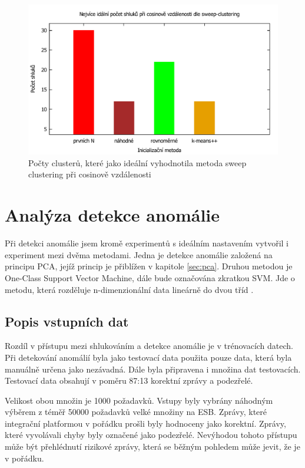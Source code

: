 \documentclass[thesis=M,czech]{FITthesis}[2012/10/20]
\newcommand{\tmpframe}[1]{\fbox{#1}}
\renewcommand{\tmpframe}[1]{#1}
\begin{document}
		\begin{figure}[htb]\centering
			\tmpframe{\includegraphics[width=\textwidth]{./img/cosine-sweep-clusters}}	
			\caption{Počty clusterů, které jako ideální vyhodnotila metoda sweep clustering při cosinově vzdálenosti}
			\label{fig:k-means-num-clusters-cosine}
		\end{figure}
	
		
	\section{Analýza detekce anomálie}
		Při detekci anomálie jsem kromě experimentů s ideálním nastavením vytvořil i experiment mezi dvěma metodami. Jedna je detekce anomálie založená na principu PCA, jejíž princip je přiblížen v kapitole \ref{sec:pca}. Druhou metodou je One-Class Support Vector Machine, dále bude označována zkratkou SVM. Jde o metodu, která rozděluje n-dimenzionální data lineárně do dvou tříd \cite{svm}.
	
		\subsection{Popis vstupních dat}
			Rozdíl v přístupu mezi shlukováním a detekce anomálie je v trénovacích datech. Při detekování anomálií byla jako testovací data použita pouze data, která byla manuálně určena jako nezávadná. Dále byla připravena i množina dat testovacích. Testovací data obsahují v poměru 87:13 korektní zprávy a podezřelé.
		
			Velikost obou množin je 1000 požadavků. Vstupy byly vybrány náhodným výběrem z téměř 50000 požadavků velké množiny na ESB. Zprávy, které integrační platformou v pořádku prošli byly hodnoceny jako korektní. Zprávy, které vyvolávali chyby byly označené jako podezřelé. Nevýhodou tohoto přístupu může být přehlédnutí rizikové zprávy, která se běžným pohledem může jevit, že je v pořádku.
		
\end{document}
